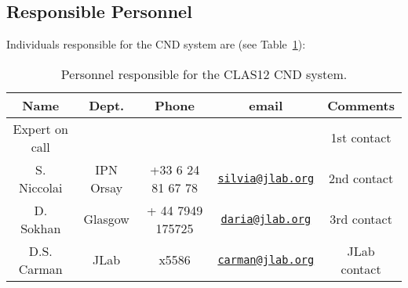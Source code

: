\subsection{Responsible Personnel}

Individuals responsible for the CND system are (see Table~\ref{tb:cnd}):

\begin{table}[!htb]
\centering
\begin{tabular}{|c|c|c|c|c|} \hline
Name&Dept.&Phone&email&Comments \\ \hline
Expert on call& &&& 1st contact \\ \hline
S. Niccolai& IPN Orsay&+33 6 24 81 67 78&\href{mailto:silvia@jlab.org}{\nolinkurl{silvia@jlab.org}}& 2nd contact \\ \hline
D. Sokhan & Glasgow & + 44 7949 175725 &\href{mailto:daria@jlab.org}{\nolinkurl{daria@jlab.org}} & 3rd contact  \\ \hline
D.S. Carman & JLab & x5586 & \href{mailto:carman@jlab.org}{\nolinkurl{carman@jlab.org}} & JLab contact \\ \hline
\end{tabular}
\caption{Personnel responsible for the CLAS12 CND system.} 
\label{tb:cnd}
\end{table}
